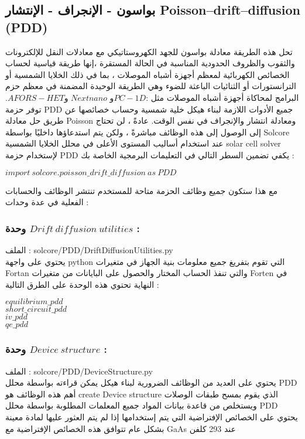 \subsection{ بواسون - الإنجراف - الإنتشار     Poisson–drift–diffusion   (PDD)}
تحل هذه الطريقة معادلة بواسون للجهد الكهروستاتيكي مع معادلات النقل للإلكترونات والثقوب والظروف الحدودية المناسبة في الحالة المستقرة ،إنها طريقة قياسية لحساب الخصائص الكهربائية لمعظم أجهزة أشباه الموصلات ، بما في ذلك الخلايا الشمسية أو الترانستورات أو الثنائيات الباعثة للضوء وهي الطريقة الوحيدة المضمنة في معظم حزم البرامج لمحاكاة أجهزة أشباه الموصلات مثل :$ PC-1D  $و $ Nextnano $ و$ AFORS-HET $.
توفر حزمة PDD جميع الأدوات اللازمة لبناء هيكل خلية شمسية وحساب خصائصها عن طريق حل معادلة Poisson ومعادلة انتشار  والإنجراف في نفس الوقت. عادةً ، لن تحتاج إلى الوصول إلى هذه الوظائف مباشرةً ، ولكن يتم استدعاؤها داخليًا بواسطة Solcore عند استخدام أساليب المستوى الأعلى في محلل الخلايا الشمسية  solar cell solver
\\
لإستخدام  حزمة PDD يكفي تضمين السطر التالي في التعليمات البرمجية الخاصة بك : 
\begin{flushleft}
	$ import ~solcore.poisson\_drift\_diffusion ~as~ PDD $
\end{flushleft}
مع هذا ستكون جميع وظائف الحزمة متاحة للمستخدم تنتشر الوظائف والحسابات الفعلية في عدة وحدات :
\subsubsection{ وحدة $ Drift ~diffusion ~utilities $ :}
الملف : solcore/PDD/DriftDiffusionUtilities.py
\\
يحتوي على واجهة python التي تقوم بتفريغ جميع معلومات بنية الجهاز في متغيرات Fortan والتي تنفذ الحساب المختار والحصول على البايانات من متغيرات Forten  في النهاية تحتوي هذه الوحدة على الطرق التالية :
\begin{flushleft}
	$ equilibrium\_pdd $ \\
	$ short \_circuit\_pdd $\\
	$ iv\_pdd $ \\
	$ qe\_pdd $  \\
\end{flushleft}
\subsubsection{وحدة $ Device~ structure $ :}
الملف : 
solcore/PDD/DeviceStructure.py
\\
يحتوي على العديد من الوظائف الضرورية لبناء هيكل يمكن قراءته بواسطة محلل PDD أهم هذه الوظائف هو create Device structure الذي يقوم بمسح طبقات الوصلات ويستخلص من قاعدة بيانات المواد جميع المعلمات المطلوبة بواسطة محلل PDD يحتوي على الخصائص الإفتراضية التي يتم إستخدامها إذا لم يتم العثور عليها لمادة معينة بشكل عام تتوافق هذه الخصائص الإفتراضية مع GaAs عند 293 كلفن 
